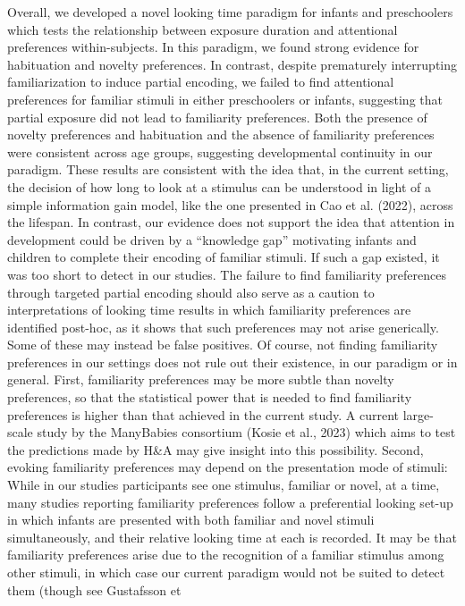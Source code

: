 \documentclass[10pt, letterpaper]{article}
\begin{document}
Overall, we developed a novel looking time paradigm for infants and
preschoolers which tests the relationship between exposure duration and
attentional preferences within-subjects. In this paradigm, we found
strong evidence for habituation and novelty preferences. In contrast,
despite prematurely interrupting familiarization to induce partial
encoding, we failed to find attentional preferences for familiar stimuli
in either preschoolers or infants, suggesting that partial exposure did
not lead to familiarity preferences. Both the presence of novelty
preferences and habituation and the absence of familiarity preferences
were consistent across age groups, suggesting developmental continuity
in our paradigm. These results are consistent with the idea that, in the
current setting, the decision of how long to look at a stimulus can be
understood in light of a simple information gain model, like the one
presented in Cao et al. (2022), across the lifespan. In contrast, our
evidence does not support the idea that attention in development could
be driven by a ``knowledge gap'' motivating infants and children to
complete their encoding of familiar stimuli. If such a gap existed, it
was too short to detect in our studies. The failure to find familiarity
preferences through targeted partial encoding should also serve as a
caution to interpretations of looking time results in which familiarity
preferences are identified post-hoc, as it shows that such preferences
may not arise generically. Some of these may instead be false positives.
Of course, not finding familiarity preferences in our settings does not
rule out their existence, in our paradigm or in general. First,
familiarity preferences may be more subtle than novelty preferences, so
that the statistical power that is needed to find familiarity
preferences is higher than that achieved in the current study. A current
large-scale study by the ManyBabies consortium (Kosie et al., 2023)
which aims to test the predictions made by H\&A may give insight into
this possibility. Second, evoking familiarity preferences may depend on
the presentation mode of stimuli: While in our studies participants see
one stimulus, familiar or novel, at a time, many studies reporting
familiarity preferences follow a preferential looking set-up in which
infants are presented with both familiar and novel stimuli
simultaneously, and their relative looking time at each is recorded. It
may be that familiarity preferences arise due to the recognition of a
familiar stimulus among other stimuli, in which case our current
paradigm would not be suited to detect them (though see Gustafsson et
\end{document}
